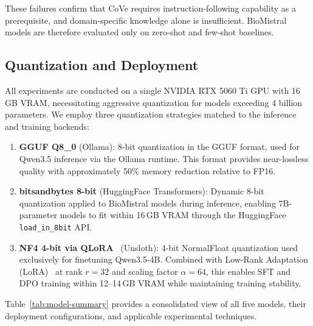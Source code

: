 \documentclass[12pt,a4paper,oneside]{report}
\begin{document}
These failures confirm that CoVe requires instruction-following capability as a prerequisite, and domain-specific knowledge alone is insufficient. BioMistral models are therefore evaluated only on zero-shot and few-shot baselines.

\subsection{Quantization and Deployment}
\label{subsec:quantization}

All experiments are conducted on a single NVIDIA RTX 5060 Ti GPU with 16\,GB VRAM, necessitating aggressive quantization for models exceeding 4 billion parameters. We employ three quantization strategies matched to the inference and training backends:

\begin{enumerate}
    \item \textbf{GGUF Q8\_0} (Ollama): 8-bit quantization in the GGUF format, used for Qwen3.5 inference via the Ollama runtime. This format provides near-lossless quality with approximately 50\% memory reduction relative to FP16.

    \item \textbf{bitsandbytes 8-bit} (HuggingFace Transformers): Dynamic 8-bit quantization applied to BioMistral models during inference, enabling 7B-parameter models to fit within 16\,GB VRAM through the HuggingFace \texttt{load\_in\_8bit} API.

    \item \textbf{NF4 4-bit via QLoRA}~\cite{dettmers2023qlora} (Unsloth): 4-bit NormalFloat quantization used exclusively for finetuning Qwen3.5-4B. Combined with Low-Rank Adaptation (LoRA)~\cite{hu2022lora} at rank $r{=}32$ and scaling factor $\alpha{=}64$, this enables SFT and DPO training within 12--14\,GB VRAM while maintaining training stability.
\end{enumerate}

Table~\ref{tab:model-summary} provides a consolidated view of all five models, their deployment configurations, and applicable experimental techniques.
\end{document}
